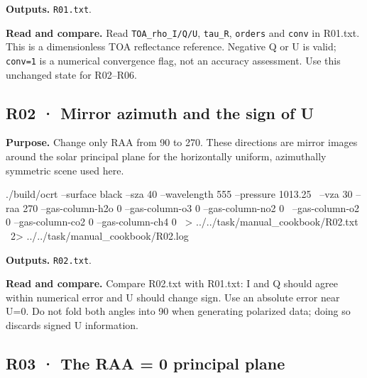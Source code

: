 \textbf{Outputs. }\texttt{R01.txt}.

\textbf{Read and compare. }Read \texttt{TOA\_\allowbreak{}rho\_\allowbreak{}I/\allowbreak{}Q/\allowbreak{}U}, \texttt{tau\_\allowbreak{}R}, \texttt{orders} and \texttt{conv} in R01.txt. This is a dimensionless TOA reflectance reference. Negative Q or U is valid; \texttt{conv=\allowbreak{}1} is a numerical convergence flag, not an accuracy assessment. Use this unchanged state for R02–R06.


\subsection{R02 · Mirror azimuth and the sign of U}
\label{sec:auto:09_cookbook:2.2}

\label{recipe:R02}

\textbf{Purpose. }Change only RAA from 90\textdegree{} to 270\textdegree{}. These directions are mirror images around the solar principal plane for the horizontally uniform, azimuthally symmetric scene used here.

\noindent\begin{minipage}{\linewidth}
\begin{ManualCode}

./build/ocrt --surface black --sza 40 --wavelength 555 --pressure 1013.25 \
  --vza 30 --raa 270 --gas-column-h2o 0 --gas-column-o3 0 --gas-column-no2 0 \
  --gas-column-o2 0 --gas-column-co2 0 --gas-column-ch4 0 \
  > ../../task/manual_cookbook/R02.txt \
  2> ../../task/manual_cookbook/R02.log

\end{ManualCode}
\end{minipage}\par

\textbf{Outputs. }\texttt{R02.txt}.

\textbf{Read and compare. }Compare R02.txt with R01.txt: I and Q should agree within numerical error and U should change sign. Use an absolute error near U=0. Do not fold both angles into 90\textdegree{} when generating polarized data; doing so discards signed U information.

\Needspace{17\baselineskip}

\subsection{R03 · The RAA = 0 principal plane}
\label{sec:auto:09_cookbook:2.3}

